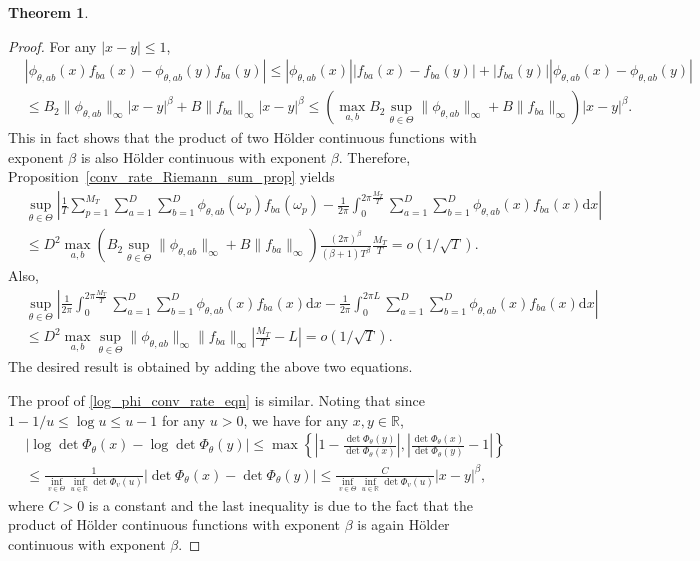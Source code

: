 \documentclass[11pt]{article}
\numberwithin{equation}{section}
\theoremstyle{plain}
\theoremstyle{definition}
\theoremstyle{definition}
\theoremstyle{assumption}
\theoremstyle{proposition}
\theoremstyle{proposition}
\theoremstyle{example}
\theoremstyle{lemma}
\theoremstyle{theorem}
\newtheorem{theorem}{Theorem}[section]
\theoremstyle{remark}
\begin{document}
\begin{theorem}
\begin{proof}
For any $|x-y|\leqslant 1$,
\begin{align*}
&|\phi_{\theta, ab}(x)f_{ba}(x) - \phi_{\theta, ab}(y)f_{ba}(y)|
\leqslant |\phi_{\theta, ab}(x)||f_{ba}(x) - f_{ba}(y)| + |f_{ba}(y)||\phi_{\theta, ab}(x)- \phi_{\theta, ab}(y)| \\
&\leqslant B_2\|\phi_{\theta, ab}\|_{\infty}|x-y|^{\beta} + B\|f_{ba}\|_{\infty}|x-y|^{\beta}
\leqslant (\max_{a,b}B_2\sup_{\theta\in\Theta}\|\phi_{\theta, ab}\|_{\infty} + B\|f_{ba}\|_{\infty})|x-y|^{\beta} . 
\end{align*}
This in fact shows that the product of two H{\"o}lder continuous functions with exponent $\beta$ is also H{\"o}lder continuous with exponent $\beta$. Therefore, Proposition~\ref{conv_rate_Riemann_sum_prop} yields
\begin{align*}
&\sup_{\theta\in\Theta}\left|\frac{1}{T}\sum_{p=1}^{M_T}\sum_{a=1}^D\sum_{b=1}^D\phi_{\theta, ab}(\omega_p)f_{ba}(\omega_p)
- \frac{1}{2\pi}\int_0^{2\pi \frac{M_T}{T}}\sum_{a=1}^D\sum_{b=1}^D\phi_{\theta, ab}(x)f_{ba}(x)\mathrm{d}x \right| \\
&\leqslant D^2\max_{a,b}(B_2\sup_{\theta\in\Theta}\|\phi_{\theta, ab}\|_{\infty} + B\|f_{ba}\|_{\infty}) \frac{(2\pi)^{\beta}}{(\beta+1)T^{\beta}} \frac{M_T}{T}
= o(1/\sqrt{T}) .
\end{align*}
Also,
\begin{align*}
&\sup_{\theta\in\Theta}\left|\frac{1}{2\pi}\int_0^{2\pi \frac{M_T}{T}}\sum_{a=1}^D\sum_{b=1}^D\phi_{\theta, ab}(x)f_{ba}(x)\mathrm{d}x - \frac{1}{2\pi}\int_0^{2\pi L}\sum_{a=1}^D\sum_{b=1}^D\phi_{\theta, ab}(x)f_{ba}(x)\mathrm{d}x\right| \\
&\leqslant D^2\max_{a,b}\sup_{\theta\in\Theta}\|\phi_{\theta, ab}\|_{\infty} \|f_{ba}\|_{\infty}\left|\frac{M_T}{T} - L\right|
=o(1/\sqrt{T}).
\end{align*}
The desired result is obtained by adding the above two equations.


The proof of \eqref{log_phi_conv_rate_eqn} is similar. Noting that since $1 - 1/u\leqslant\log u \leqslant u - 1$ for any $u > 0$, we have for any $x,y\in\mathbb{R}$,
\begin{align*}
&|\log\det\Phi_{\theta}(x) - \log\det\Phi_{\theta}(y)| \leqslant \max\left\{\left| 1 - \frac{\det\Phi_{\theta}(y)}{\det\Phi_{\theta}(x)}\right|,\left| \frac{\det\Phi_{\theta}(x)}{\det\Phi_{\theta}(y)} - 1 \right|\right\} \\
&\leqslant \frac{1}{\inf_{v\in\Theta}\inf_{u\in\mathbb{R}}\det\Phi_{v}(u)}|\det\Phi_{\theta}(x) -\det\Phi_{\theta}(y)|\leqslant \frac{C}{\inf_{v\in\Theta}\inf_{u\in\mathbb{R}}\det\Phi_{v}(u)}|x-y|^{\beta} ,
\end{align*}
where $C>0$ is a constant and the last inequality is due to the fact that the product of H{\"o}lder continuous functions with exponent $\beta$ is again H{\"o}lder continuous with exponent $\beta$.
\end{proof}
\end{theorem}
\end{document}
